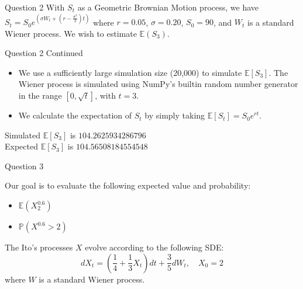 \documentclass[compress,12pt]{beamer}
\begin{document}
\begin{frame}{Question 2}
    With $S_t$ as a Geometric Brownian Motion process, we have $S_t = S_0e^{(\sigma W_t + (r - \frac{\sigma^2}{2})t)}$ where $r = 0.05$, $\sigma = 0.20$, $S_0 = 90$, and $W_t$ is a standard Wiener process. We wish to estimate $\mathbb{E}(S_3)$.
\end{frame}

\begin{frame}{Question 2 Continued}

    \begin{itemize}
        \item We use a sufficiently large simulation size (20,000) to simulate $\mathbb{E}[S_3]$. The Wiener process is simulated using NumPy's
        builtin random number generator in the range $[0, \sqrt{t}]$, with $t = 3$.
        \item We calculate the expectation of $S_t$ by simply taking $\mathbb{E}[S_t] = S_0e^{rt}$.
    
    \end{itemize}

    \begin{tcolorbox}
        Simulated $\mathbb{E}[S_3]$ is $\boxed{104.2625934286796}$\\
        Expected $\mathbb{E}[S_3]$ is $\boxed{104.56508184554548}$
    \end{tcolorbox}
\end{frame}


\begin{frame}{Question 3}

    Our goal is to evaluate the following expected value and probability:
    \begin{itemize}
        \item $\mathbb{E}(X^{0.6}_{2})$
        \item $\mathbb{P}(X^{0.6}> 2)$
    \end{itemize}

    The Ito's processes $X$ evolve according to the following SDE:
    \begin{equation*}
        dX_t = \left( \frac{1}{4} + \frac{1}{3}X_t \right) dt + \frac{3}{5} dW_t, \quad X_0 = 2
    \end{equation*}
    where $W$ is a standard Wiener process.

\end{frame}
\end{document}
